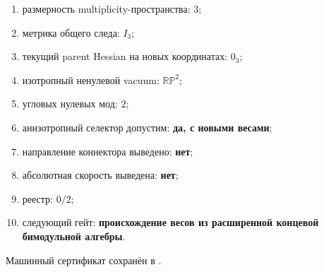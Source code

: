 \begin{protocol}\begin{enumerate}
\item размерность multiplicity-пространства: \textbf{$3$};
\item метрика общего следа: \textbf{$I_3$};
\item текущий parent Hessian на новых координатах: \textbf{$0_3$};
\item изотропный ненулевой vacuum: \textbf{$\mathbb{RP}^2$};
\item угловых нулевых мод: \textbf{$2$};
\item анизотропный селектор допустим: \textbf{да, с новыми весами};
\item направление коннектора выведено: \textbf{нет};
\item абсолютная скорость выведена: \textbf{нет};
\item реестр: \textbf{$0/2$};
\item следующий гейт: \textbf{происхождение весов из расширенной
концевой бимодульной алгебры}.
\end{enumerate}\end{protocol}

Машинный сертификат сохранён в
.